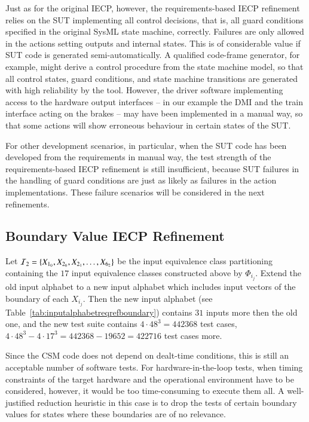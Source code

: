 Just as for the original IECP, however, the requirements-based IECP refinement relies on the SUT implementing all control decisions, that is, all guard conditions specified in the original SysML state machine, correctly. Failures are only allowed in the actions setting outputs and internal states. This is of considerable value if SUT code is generated semi-automatically.  A qualified code-frame generator, for example, might derive a control procedure from the state machine model, so that all control states, guard conditions, and state machine transitions are generated with high reliability by the tool. However, the driver software implementing access to the hardware output interfaces -- in our example the DMI and the train interface acting on the brakes -- may have been implemented in a manual way, so that some actions will show erroneous behaviour in certain states of the SUT. 

For other development scenarios, in particular, when the SUT code has been developed from the requirements in manual way, the test strength of the requirements-based IECP refinement is still insufficient, because SUT failures in the handling of guard conditions are just as likely as failures in the action implementations. These failure scenarios will be considered in the next refinements.


\subsection{Boundary Value IECP Refinement}
Let ${\cal I}_2=\{X_{1_0},X_{2_0},X_{2_1},\dots, X_{6_2}\}$ be the input equivalence class partitioning containing the $17$ input equivalence classes constructed above by $\Phi_{i_j}$. Extend the old input alphabet to a new input alphabet which includes input vectors of the boundary of each $X_{i_j}$. Then the new input alphabet (see Table~\ref{tab:inputalphabetreqrefboundary}) contains $31$ inputs more then the old one, and the new test suite contains $4\cdot 48^3=442368$ test cases, $4\cdot 48^3- 4\cdot 17^3=442368-19652=422716$ test cases more.  

Since the CSM code does not depend on dealt-time conditions, this is still an acceptable number of software tests. For hardware-in-the-loop tests, when timing constraints of the target hardware and the operational environment have to be considered, however, it would be too time-consuming to execute them all. A well-justified reduction heuristic in this case is to drop the tests of certain boundary values for states where these boundaries are of no relevance. 


